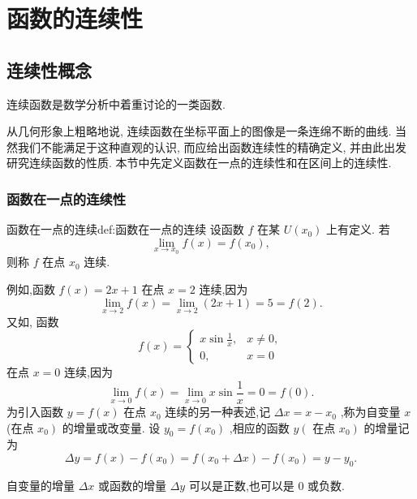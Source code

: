 \chapter{函数的连续性}

\section{连续性概念}

连续函数是数学分析中着重讨论的一类函数.

从几何形象上粗略地说, 连续函数在坐标平面上的图像是一条连绵不断的曲线. 当然我们不能满足于这种直观的认识, 而应给出函数连续性的精确定义, 并由此出发研究连续函数的性质. 本节中先定义函数在一点的连续性和在区间上的连续性.

\subsection{函数在一点的连续性}

\begin{definition}{函数在一点的连续}{def:函数在一点的连续}
设函数 \(f\) 在某 \(U\left( {x}_{0}\right)\) 上有定义. 若
\[
\mathop{\lim }\limits_{{x \rightarrow  {x}_{0}}}f\left( x\right)  = f\left( {x}_{0}\right) , \tag{1}
\]
则称 \(f\) 在点 \({x}_{0}\) 连续.
\end{definition}


例如,函数 \(f\left( x\right)  = {2x} + 1\) 在点 \(x = 2\) 连续,因为
\[
\mathop{\lim }\limits_{{x \rightarrow  2}}f\left( x\right)  = \mathop{\lim }\limits_{{x \rightarrow  2}}\left( {{2x} + 1}\right)  = 5 = f\left( 2\right) .
\]
又如, 函数
\[
f\left( x\right)  = \left\{  \begin{matrix} x\sin \frac{1}{x}, & x \neq  0, \\  0, & x = 0 \end{matrix}\right.
\]
在点 \(x = 0\) 连续,因为
\[
\mathop{\lim }\limits_{{x \rightarrow  0}}f\left( x\right)  = \mathop{\lim }\limits_{{x \rightarrow  0}}x\sin \frac{1}{x} = 0 = f\left( 0\right) .
\]
为引入函数 \(y = f\left( x\right)\) 在点 \({x}_{0}\) 连续的另一种表述,记 \({\Delta x} = x - {x}_{0}\) ,称为自变量 \(x\) (在点 \(\left. {x}_{0}\right)\) 的增量或改变量. 设 \({y}_{0} = f\left( {x}_{0}\right)\) ,相应的函数 \(y\left( \right.\) 在点 \(\left. {x}_{0}\right)\) 的增量记为
\[
{\Delta y} = f\left( x\right)  - f\left( {x}_{0}\right)  = f\left( {{x}_{0} + {\Delta x}}\right)  - f\left( {x}_{0}\right)  = y - {y}_{0}.
\]
\begin{remark}
自变量的增量 \({\Delta x}\) 或函数的增量 \({\Delta y}\) 可以是正数,也可以是 0 或负数.
\end{remark}


